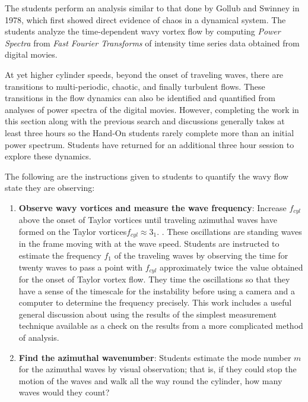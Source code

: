 \documentclass[%
 amsmath,amssymb,
 aps,
floatfix,
aps,prd,longbibliography,
notitlepage
]{revtex4-1}
\begin{document}
 The students perform an analysis similar to that done by Gollub and Swinney in 1978\cite{gollub_swinney_1978}, which first showed direct evidence of chaos in a dynamical system. The students analyze the time-dependent wavy vortex flow by computing {\it Power Spectra} from {\it Fast Fourier Transforms} of intensity time series data obtained from digital movies.  

At yet higher cylinder speeds, beyond the onset of traveling waves, there are transitions to multi-periodic, chaotic, and finally turbulent flows.  These transitions in the flow dynamics can also be identified and quantified from analyses of  power spectra of the digital movies. However, completing the work in this section along with the previous search and discussions generally takes at least three hours so the Hand-On students rarely complete more than an initial power spectrum. Students have returned for an additional three hour session to explore these dynamics.

The following are the instructions given to students to quantify the wavy flow state they are observing:

\begin{enumerate}
\item {\bf Observe wavy vortices and measure the wave frequency}: Increase $f_{cyl}$ above the onset of Taylor vortices until traveling azimuthal waves have formed on the Taylor vortices$f_{cyl}\approx 3_1$. . These oscillations are standing waves in the frame moving with at the wave speed. Students are instructed to estimate the frequency $f_1$ of the traveling waves by observing the time for twenty waves to pass a point with $f_{cyl}$ approximately twice the value obtained for the onset of Taylor vortex flow. They time the oscillations so that they have a sense of the timescale for the instability before using a camera and a computer to determine the frequency precisely. This work includes a useful general discussion about using the results of the simplest measurement technique available as a check on the results from a more complicated method of analysis.

\item {\bf Find the azimuthal wavenumber}:  Students estimate  the mode number $m$ for the azimuthal waves by visual observation; that is, if they could stop the motion of the waves and walk all the way round the cylinder, how many waves would they count?

\end{enumerate}
\end{document}
